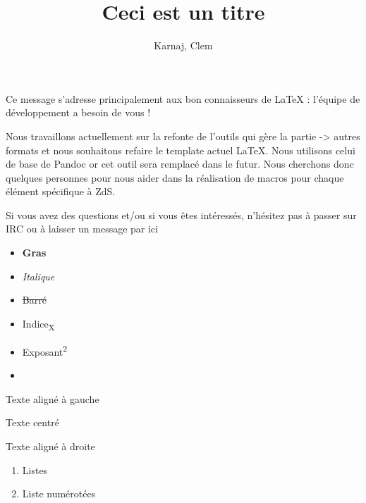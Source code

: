 \documentclass[small]{zmdocument}
\title{Ceci est un titre}
\author{Karnaj, Clem}
\begin{document}
\maketitle
\tableofcontents

\levelOneIntroduction

Ce message s’adresse principalement aux bon connaisseurs de LaTeX : l’équipe de développement a besoin de vous ! 



Nous travaillons actuellement sur la refonte de l’outils qui gère la partie  -> autres formats et nous souhaitons refaire le template actuel LaTeX. Nous utilisons celui de base de Pandoc or cet outil sera remplacé dans le futur. Nous cherchons donc quelques personnes pour nous aider dans la réalisation de macros pour chaque élément spécifique à ZdS.

Si vous avez des questions et/ou si vous êtes intéressés, n’hésitez pas à passer sur IRC ou à laisser un message par ici 



\begin{itemize}
\item \textbf{Gras}
\item \textit{Italique}
\item \sout{Barré}
\item Indice\textsubscript{X}
\item Exposant\textsuperscript{2}
\item {}
\end{itemize}


\begin{flushleft}
Texte aligné à gauche
\end{flushleft}

\begin{center}
Texte centré
\end{center}

\begin{flushright}
Texte aligné à droite
\end{flushright}

\begin{enumerate}
\item Listes
\item Liste numérotées
\end{enumerate}
\end{document}

